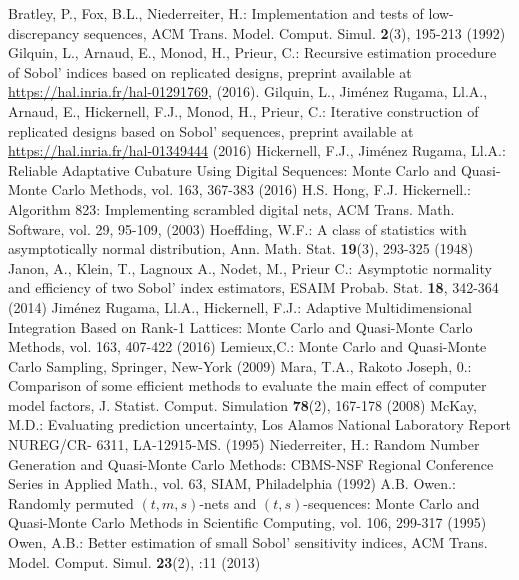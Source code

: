 \begin{thebibliography}{99}
%
%

Bratley, P., Fox, B.L., Niederreiter, H.: Implementation and tests of low-discrepancy sequences, ACM Trans. Model. Comput. Simul. \textbf{2}(3), 195-213 (1992)
Gilquin, L., Arnaud, E., Monod, H., Prieur, C.: Recursive estimation procedure of Sobol' indices based on replicated designs, preprint available at \url{https://hal.inria.fr/hal-01291769}, (2016).
Gilquin, L., Jim\'enez Rugama, Ll.A., Arnaud, E., Hickernell, F.J., Monod, H., Prieur, C.: Iterative construction of replicated designs based on Sobol' sequences, preprint available at \url{https://hal.inria.fr/hal-01349444} (2016)
Hickernell, F.J., Jim\'enez Rugama, Ll.A.: Reliable Adaptative Cubature Using Digital Sequences: Monte Carlo and Quasi-Monte Carlo Methods, vol. 163, 367-383 (2016)
H.S. Hong, F.J. Hickernell.: Algorithm 823: Implementing scrambled digital nets, ACM Trans. Math. Software, vol. 29, 95-109, (2003)
Hoeffding, W.F.: A class of statistics with asymptotically normal distribution, Ann. Math. Stat. \textbf{19}(3), 293-325 (1948)
Janon, A., Klein, T., Lagnoux A., Nodet, M., Prieur C.: Asymptotic normality and efficiency of two {S}obol' index estimators, ESAIM Probab. Stat. \textbf{18}, 342-364 (2014)
Jim\'enez Rugama, Ll.A., Hickernell, F.J.: Adaptive Multidimensional Integration Based on Rank-1 Lattices: Monte Carlo and Quasi-Monte Carlo Methods, vol. 163, 407-422 (2016)
Lemieux,C.: Monte Carlo and Quasi-Monte Carlo Sampling, Springer, New-York (2009)
Mara, T.A., Rakoto Joseph, 0.: Comparison of some efficient methods to evaluate the main effect of computer model factors, J. Statist. Comput. Simulation \textbf{78}(2), 167-178 (2008)
McKay, M.D.: Evaluating prediction uncertainty, Los Alamos National Laboratory Report NUREG/CR- 6311, LA-12915-MS. (1995)
Niederreiter, H.: Random Number Generation and Quasi-Monte Carlo Methods: CBMS-NSF Regional Conference Series in Applied Math., vol. 63, SIAM, Philadelphia (1992)
A.B. Owen.: Randomly permuted $(t,m,s)$-nets and $(t,s)$-sequences: Monte Carlo and Quasi-Monte Carlo Methods in Scientific Computing, vol. 106, 299-317 (1995)
Owen, A.B.: Better estimation of small Sobol' sensitivity indices, ACM Trans. Model. Comput. Simul. \textbf{23}(2), :11 (2013)

\end{thebibliography}
